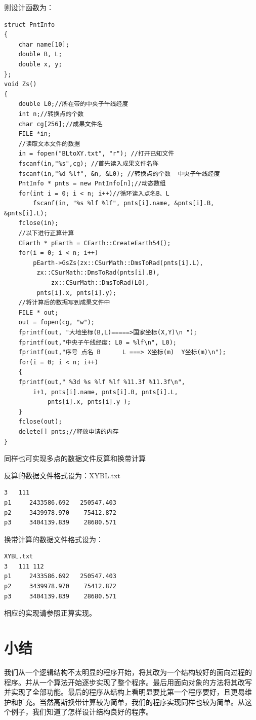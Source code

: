 则设计函数为：
\begin{verbatim}
struct PntInfo
{
    char name[10];
    double B, L;
    double x, y;
};
void Zs()
{
    double L0;//所在带的中央子午线经度
    int n;//转换点的个数
    char cg[256];//成果文件名
    FILE *in;
    //读取文本文件的数据
    in = fopen("BLtoXY.txt", "r"); //打开已知文件
    fscanf(in,"%s",cg); //首先读入成果文件名称
    fscanf(in,"%d %lf", &n, &L0); //转换点的个数  中央子午线经度
    PntInfo * pnts = new PntInfo[n];//动态数组
    for(int i = 0; i < n; i++)//循环读入点名B、L
        fscanf(in, "%s %lf %lf", pnts[i].name, &pnts[i].B, &pnts[i].L);
    fclose(in);
    //以下进行正算计算
    CEarth * pEarth = CEarth::CreateEarth54();
    for(i = 0; i < n; i++)
        pEarth->GsZs(zx::CSurMath::DmsToRad(pnts[i].L),
         zx::CSurMath::DmsToRad(pnts[i].B),
             zx::CSurMath::DmsToRad(L0),
         pnts[i].x, pnts[i].y);
    //将计算后的数据写到成果文件中
    FILE * out;
    out = fopen(cg, "w");
    fprintf(out, "大地坐标(B,L)=====>国家坐标(X,Y)\n ");
    fprintf(out,"中央子午线经度: L0 = %lf\n", L0);
    fprintf(out,"序号 点名 B      L ===> X坐标(m)  Y坐标(m)\n");
    for(i = 0; i < n; i++)
    {
    fprintf(out," %3d %s %lf %lf %11.3f %11.3f\n",
        i+1, pnts[i].name, pnts[i].B, pnts[i].L,
            pnts[i].x, pnts[i].y );
    }
    fclose(out);
    delete[] pnts;//释放申请的内存
}
\end{verbatim}

同样也可实现多点的数据文件反算和换带计算

反算的数据文件格式设为：XYBL.txt
\begin{verbatim}
3   111
p1     2433586.692   250547.403
p2     3439978.970    75412.872
p3     3404139.839    28680.571
\end{verbatim}

换带计算的数据文件格式设为：
\begin{verbatim}
XYBL.txt
3   111 112
p1     2433586.692   250547.403
p2     3439978.970    75412.872
p3     3404139.839    28680.571
\end{verbatim}
相应的实现请参照正算实现。

\section{小结}
我们从一个逻辑结构不太明显的程序开始，将其改为一个结构较好的面向过程的
程序。并从一个算法开始逐步实现了整个程序。最后用面向对象的方法将其改写
并实现了全部功能。最后的程序从结构上看明显要比第一个程序要好，且更易维
护和扩充。当然高斯换带计算较为简单，我们的程序实现同样也较为简单。从这
个例子，我们知道了怎样设计结构良好的程序。
